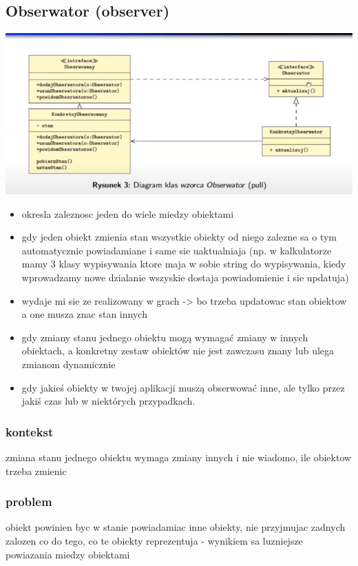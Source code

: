 \documentclass[11pt]{article}
\begin{document}
\subsection{Obserwator (observer)}
\label{sec:orgd763a6f}
\begin{center}
\includegraphics[width=.9\linewidth]{./obserwator.png}
\end{center}
\begin{itemize}
\item okresla zaleznosc jeden do wiele miedzy obiektami
\item gdy jeden obiekt zmienia stan wszystkie obiekty od niego zalezne sa o tym automatycznie powiadamiane i same sie uaktualniaja (np. w kalkulatorze mamy 3 klasy wypisywania ktore maja w sobie string do wypisywania, kiedy wprowadzamy nowe dzialanie wszyskie dostaja powiadomienie i sie  updatuja)
\item wydaje mi sie ze realizowany w grach -> bo trzeba updatowac stan obiektow a one musza znac stan innych
\item gdy zmiany stanu jednego obiektu mogą wymagać zmiany w innych obiektach, a konkretny zestaw obiektów nie jest zawczasu znany lub ulega zmianom dynamicznie
\item gdy jakieś obiekty w twojej aplikacji muszą obserwować inne, ale tylko przez jakiś czas lub w niektórych przypadkach.
\end{itemize}
\subsubsection{kontekst}
\label{sec:org77c5e77}
zmiana stanu jednego obiektu wymaga zmiany innych i nie wiadomo, ile obiektow trzeba zmienic
\subsubsection{problem}
\label{sec:org87a1217}
obiekt powinien byc w stanie powiadamiac inne obiekty, nie przyjmujac zadnych zalozen co do tego, co te obiekty reprezentuja - wynikiem sa luzniejsze powiazania miedzy obiektami
\end{document}
